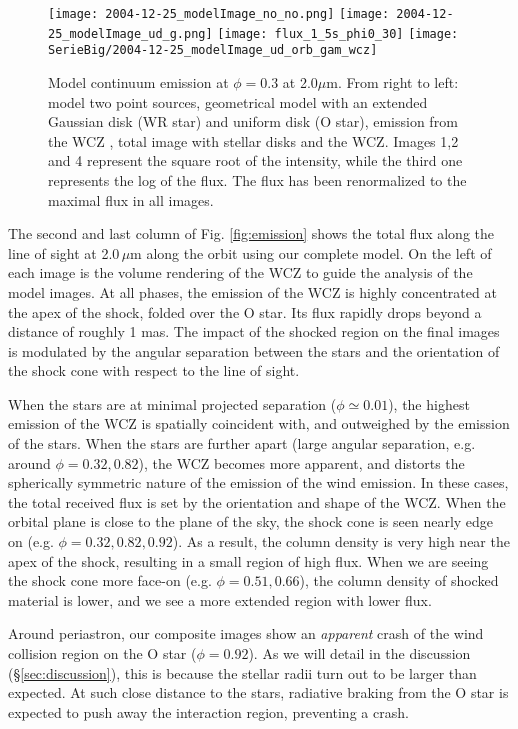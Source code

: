\documentclass[usenatbib]{mnras}%
\begin{document}
\begin{figure*}
\centering
\texttt{[image: 2004-12-25\_modelImage\_no\_no.png]}
\texttt{[image: 2004-12-25\_modelImage\_ud\_g.png]}
\texttt{[image: flux\_1\_5s\_phi0\_30]}
\texttt{[image: SerieBig/2004-12-25\_modelImage\_ud\_orb\_gam\_wcz]} 
\caption{Model continuum emission at $\phi=0.3$ at 2.0$\mu$m. From right to left: model two point sources, geometrical model with  an extended Gaussian disk (WR star) and uniform disk (O star),  emission from the WCZ ,  total image with stellar disks and the WCZ. Images 1,2 and 4 represent the square root of the intensity, while the third one represents the log of the flux. The flux has been renormalized to the maximal flux in all images.}
\label{fig:mocks}
\end{figure*}



The second and last column of Fig. \ref{fig:emission} shows the total flux along the line of sight  at 2.0\,$\mu$m along the orbit using our complete model. On the left of each image is the volume rendering of the WCZ to guide the analysis of the model images.   At all phases, the emission of the WCZ is highly concentrated at the apex of the shock, folded over the O star. Its  flux rapidly drops  beyond a distance of roughly 1 mas.  The impact of the shocked region on the final images is modulated by the angular separation between the stars and the orientation of the shock cone with respect to the line of sight. 


When the stars are at minimal projected separation ($\phi\simeq 0.01$), the highest emission of the WCZ is spatially coincident with, and outweighed by the emission of the stars. When the stars are further apart (large angular separation, e.g. around $\phi=0.32, 0.82$), the WCZ becomes more apparent, and distorts the spherically symmetric nature of the emission of the wind emission. In these cases, the total received flux is set by the orientation and shape  of the WCZ.  When the orbital plane is close to the plane of the sky, the shock cone is seen nearly edge on (e.g. $\phi=0.32, 0.82, 0.92$). As a result, the column density is very high near the apex of the shock, resulting in a small region of high flux.  When we are seeing the shock cone more face-on (e.g. $\phi=0.51, 0.66$), the column density of shocked material is lower, and we see a more extended region with lower flux.

Around periastron, our composite images show an \textit{apparent} crash of the wind collision region on the O star ($\phi=0.92$). As we will detail in the discussion (\S\ref{sec:discussion}), this is because the stellar radii turn out to be larger than expected. At such close distance to the stars, radiative braking from the O star is expected to push away the interaction region, preventing a crash.
\end{document}
